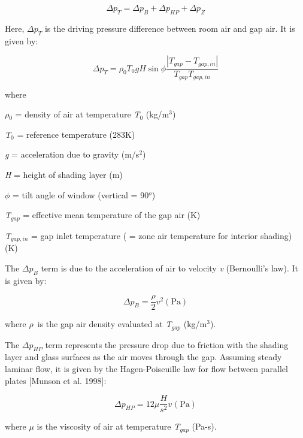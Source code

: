 \begin{equation}
\Delta {p_T} = \Delta {p_B} + \Delta {p_{HP}} + \Delta {p_Z}
\label{eq:PressureBalanceEquationAirflow}
\end{equation}

Here, \(\Delta p_T\) is the driving pressure difference between room air and gap air. It is given by:

\begin{equation}
\Delta {p_T} = {\rho_0}{T_0}gH\sin \phi \frac{{\left| {{T_{gap}} - {T_{gap,in}}} \right|}}{{{T_{gap}}{T_{gap,in}}}}
\end{equation}

where

\emph{$\rho$\(_{0}\)} = density of air at temperature \emph{T\(_{0}\)} (kg/m\(^{3}\))

\emph{T\(_{0}\)} = reference temperature (283K)

\emph{g} = acceleration due to gravity (m/s\(^{2}\))

\emph{H} = height of shading layer (m)

\emph{$\phi$} = tilt angle of window (vertical = 90\(^{o}\))

\emph{T\(_{gap}\)} = effective mean temperature of the gap air (K)

\emph{T\(_{gap,in}\)} = gap inlet temperature ( = zone air temperature for interior shading) (K)

The \(\Delta p_B\) term is due to the acceleration of air to velocity \emph{v} (Bernoulli's law). It is given by:

\begin{equation}
\Delta {p_B} = \frac{\rho }{2}{v^2}{\mathrm{    (Pa)}}
\end{equation}

where \emph{$\rho$}~is the gap air density evaluated at \emph{T\(_{gap}\)} (kg/m\(^{3}\)).

The \(\Delta p_{HP}\) term represents the pressure drop due to friction with the shading layer and glass surfaces as the air moves through the gap. Assuming steady laminar flow, it is given by the Hagen-Poiseuille law for flow between parallel plates {[}Munson et al. 1998{]}:

\begin{equation}
\Delta {p_{HP}} = 12\mu \frac{H}{{{s^2}}}{v^{}}{\mathrm{    (Pa)}}
\end{equation}

where \emph{$\mu$} is the viscosity of air at temperature \emph{T\(_{gap}\)} (Pa-s).

